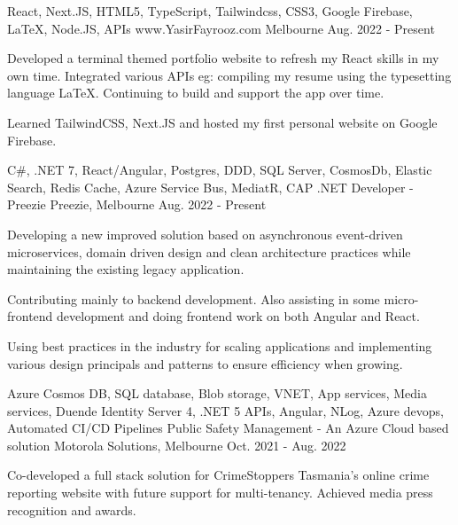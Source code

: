 

\vspace{-0.5\baselineskip}
\begin{cventries}
  \cventry
    {React, Next.JS, HTML5, TypeScript, Tailwindcss, CSS3, Google Firebase, LaTeX, Node.JS, APIs }
    {www.YasirFayrooz.com}
    {Melbourne}
    {Aug. 2022 - Present}
    {
      \begin{cvitems}
        \item {Developed a terminal themed portfolio website to refresh my React skills in my own time. Integrated various APIs eg: compiling my resume using the typesetting language LaTeX. Continuing to build and support the app over time.}
        \item {Learned TailwindCSS, Next.JS and hosted my first personal website on Google Firebase.}
      \end{cvitems}
    }
  \vspace*{-0.3cm}
  \cventry
    {C\#, .NET 7, React/Angular, Postgres, DDD, SQL Server, CosmosDb, Elastic Search, Redis Cache, Azure Service Bus, MediatR, CAP}
    {.NET Developer - Preezie}
    {Preezie, Melbourne}
    {Aug. 2022 - Present}
    {
      \begin{cvitems}
        \item {Developing a new improved solution based on asynchronous event-driven microservices, domain driven design and clean architecture practices while maintaining the existing legacy application.}
        \item {Contributing mainly to backend development. Also assisting in some micro-frontend development and doing frontend work on both Angular and React.}
        \item {Using best practices in the industry for scaling applications and implementing various design principals and patterns to ensure efficiency when growing.}
	  \end{cvitems}
    }
  \cventry
    {Azure Cosmos DB, SQL database, Blob storage, VNET, App services, Media services, Duende Identity Server 4, .NET 5 APIs, Angular, NLog, Azure devops, Automated CI/CD Pipelines}
    {Public Safety Management - An Azure Cloud based solution}
    {Motorola Solutions, Melbourne}
    {Oct. 2021 - Aug. 2022}
    {
      \begin{cvitems}
        \item {Co-developed a full stack solution for CrimeStoppers Tasmania's online crime reporting website with future support for multi-tenancy. Achieved media press recognition and awards.}

\end{cvitems}}
\end{cventries}
